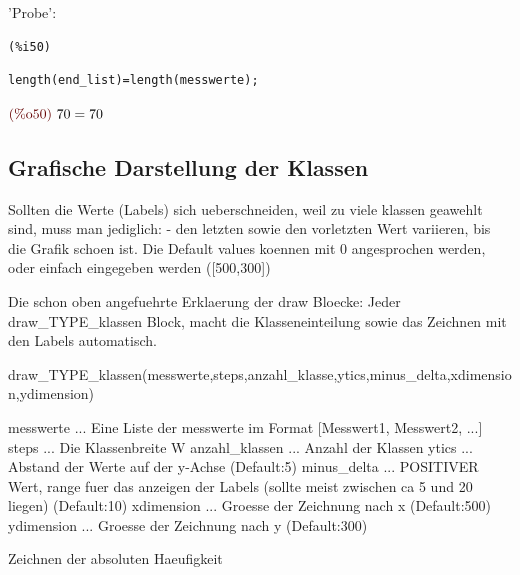 \documentclass{article}
\begin{document}
'Probe':

\noindent
\begin{minipage}[t]{8ex}{\color{red}\bf
\begin{verbatim}
(%i50) 
\end{verbatim}}
\end{minipage}
\begin{minipage}[t]{\textwidth}{\color{blue}
\begin{verbatim}
length(end_list)=length(messwerte);
\end{verbatim}}
\end{minipage}
\begin{math}\displaystyle
\parbox{8ex}{\color{labelcolor}(\%o50) }
70=70
\end{math}


\subsection{Grafische Darstellung der Klassen}


Sollten die Werte (Labels) sich ueberschneiden, weil zu viele klassen geawehlt sind, muss man jediglich:
- den letzten sowie den vorletzten Wert variieren, bis die Grafik schoen ist.
Die Default values koennen mit 0 angesprochen werden, oder einfach eingegeben werden ([500,300])

Die schon oben angefuehrte Erklaerung der draw Bloecke:
    Jeder draw\_TYPE\_klassen Block, macht die Klasseneinteilung sowie das Zeichnen mit den Labels automatisch.

draw\_TYPE\_klassen(messwerte,steps,anzahl\_klasse,ytics,minus\_delta,xdimension,ydimension)

messwerte ... Eine Liste der messwerte im Format [Messwert1, Messwert2, ...]
steps ... Die Klassenbreite W
anzahl\_klassen ... Anzahl der Klassen
ytics ... Abstand der Werte auf der y-Achse (Default:5)
minus\_delta ... POSITIVER Wert, range fuer das anzeigen der Labels (sollte meist zwischen ca 5 und 20 liegen) (Default:10)
xdimension ... Groesse der Zeichnung nach x (Default:500)
ydimension ... Groesse der Zeichnung nach y (Default:300)

Zeichnen der absoluten Haeufigkeit
\end{document}
